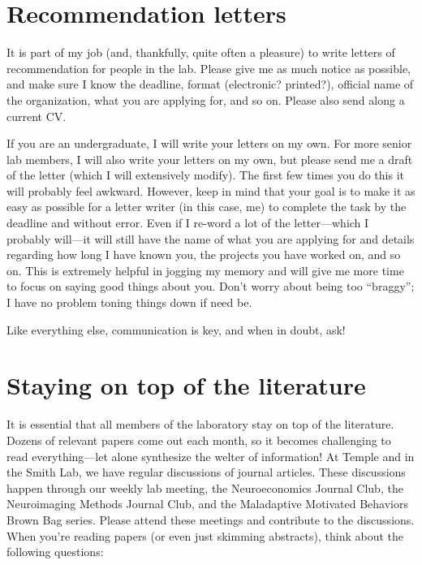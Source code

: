 \documentclass[letterpaper,12pt,oneside]{memoir}
\begin{document}
\section{Recommendation letters}
It is part of my job (and, thankfully, quite often a pleasure) to write letters of recommendation for people in the lab. Please give me as much notice as possible, and make sure I know the deadline, format (electronic? printed?), official name of the organization, what you are applying for, and so on. Please also send along a current CV.

If you are an undergraduate, I will write your letters on my own. For more senior lab members, I will also write your letters on my own, but please send me a draft of the letter (which I will extensively modify). The first few times you do this it will probably feel awkward. However, keep in mind that your goal is to make it as easy as possible for a letter writer (in this case, me) to complete the task by the deadline and without error. Even if I re-word a lot of the letter---which I probably will---it will still have the name of what you are applying for and details regarding how long I have known you, the projects you have worked on, and so on. This is extremely helpful in jogging my memory and will give me more time to focus on saying good things about you. Don't worry about being too ``braggy''; I have no problem toning things down if need be.

Like everything else, communication is key, and when in doubt, ask!

\section{Staying on top of the literature}
\label{sec:literature}

It is essential that all members of the laboratory stay on top of the literature. Dozens of relevant papers come out each month, so it becomes challenging to read everything---let alone synthesize the welter of information! At Temple and in the Smith Lab, we have regular discussions of journal articles. These discussions happen through our weekly lab meeting, the Neuroeconomics Journal Club, the Neuroimaging Methods Journal Club, and the Maladaptive Motivated Behaviors Brown Bag series. Please attend these meetings and contribute to the discussions. When you're reading papers (or even just skimming abstracts), think about the following questions:
\end{document}
